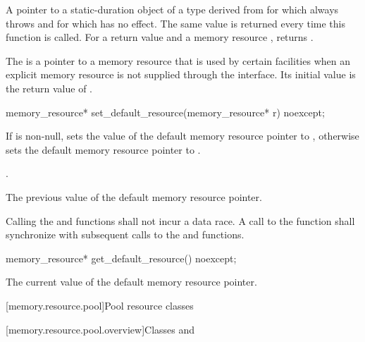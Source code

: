 \begin{itemdescr}
\pnum
\returns
A pointer to a static-duration object of a type derived from 
for which  always throws  and
for which  has no effect.
The same value is returned every time this function is called.
For a return value  and a memory resource ,
 returns .
\end{itemdescr}

\pnum
The  is a pointer to a memory resource
that is used by certain facilities when an explicit memory resource
is not supplied through the interface.
Its initial value is the return value of .

%
\begin{itemdecl}
memory_resource* set_default_resource(memory_resource* r) noexcept;
\end{itemdecl}

\begin{itemdescr}
\pnum
\effects
If  is non-null,
sets the value of the default memory resource pointer to ,
otherwise sets the default memory resource pointer to .

\pnum
\postcondition
{}.

\pnum
\returns
The previous value of the default memory resource pointer.

\pnum
\remarks
Calling the  and
 functions shall not incur a data race.
A call to the  function
shall synchronize with subsequent calls to
the  and  functions.
\end{itemdescr}

%
\begin{itemdecl}
memory_resource* get_default_resource() noexcept;
\end{itemdecl}

\begin{itemdescr}
\pnum
\returns
The current value of the default memory resource pointer.
\end{itemdescr}

[memory.resource.pool]{Pool resource classes}

[memory.resource.pool.overview]{Classes  and }

